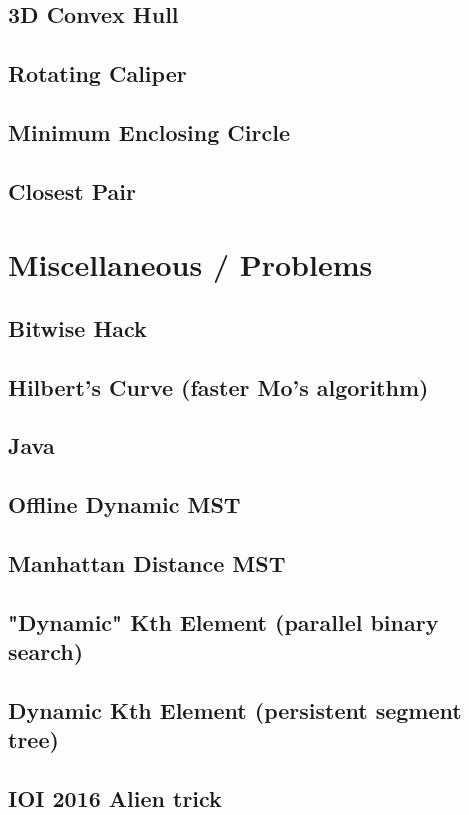 \documentclass[a4paper,10pt,twocolumn,oneside]{article}
\begin{document}
\subsection{3D Convex Hull}

\subsection{Rotating Caliper}

\subsection{Minimum Enclosing Circle}

\subsection{Closest Pair}

\section{Miscellaneous / Problems}
\subsection{Bitwise Hack}

\subsection{Hilbert's Curve (faster Mo's algorithm)}

\subsection{Java}

\subsection{Offline Dynamic MST}

\subsection{Manhattan Distance MST}

\subsection{"Dynamic" Kth Element (parallel binary search)}

\subsection{Dynamic Kth Element (persistent segment tree)}

\subsection{IOI 2016 Alien trick}

% 
\end{document}
